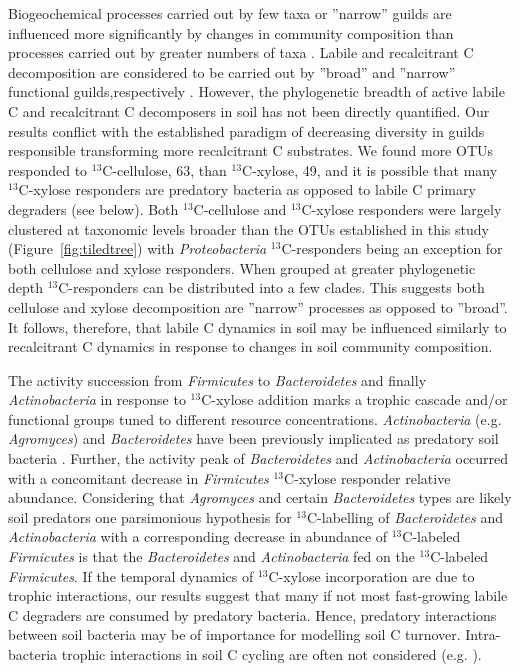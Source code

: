 Biogeochemical processes carried out by few taxa or ''narrow'' guilds are
influenced more significantly by changes in community composition than
processes carried out by greater numbers of taxa
\citep{Schimel_1995,McGuire2010}. Labile and recalcitrant C decomposition are
considered to be carried out by ''broad'' and ''narrow'' functional
guilds,respectively \citep{Schimel_1995,McGuire2010}. However, the phylogenetic
breadth of active labile C and recalcitrant C decomposers in soil has not been
directly quantified. Our results conflict with the established paradigm of
decreasing diversity in guilds responsible transforming more recalcitrant
C substrates. We found more OTUs responded to $^{13}$C-cellulose, 63, than
$^{13}$C-xylose, 49, and it is possible that many $^{13}$C-xylose responders
are predatory bacteria as opposed to labile C primary degraders (see below).
Both $^{13}$C-cellulose and $^{13}$C-xylose responders were largely clustered
at taxonomic levels broader than the OTUs established in this study
(Figure~\ref{fig:tiledtree}) with \textit{Proteobacteria} $^{13}$C-responders
being an exception for both cellulose and xylose responders. When grouped at
greater phylogenetic depth $^{13}$C-responders can be distributed into a few
clades. This suggests both cellulose and xylose decomposition are ''narrow''
processes as opposed to ''broad''. It follows, therefore, that labile C dynamics
in soil may be influenced similarly to recalcitrant C dynamics in response to
changes in soil community composition. 

The activity succession from \textit{Firmicutes} to \textit{Bacteroidetes} and
finally \textit{Actinobacteria} in response to $^{13}$C-xylose addition marks
a trophic cascade and/or functional groups tuned to different resource
concentrations. \textit{Actinobacteria} (e.g. \textit{Agromyces}) and
\textit{Bacteroidetes} have been previously implicated as predatory soil
bacteria \citep{Lueders2006}. Further, the activity peak of
\textit{Bacteroidetes} and \textit{Actinobacteria} occurred with a concomitant
decrease in \textit{Firmicutes} $^{13}$C-xylose responder relative abundance.
Considering that \textit{Agromyces} and certain \textit{Bacteroidetes} types
are likely soil predators \citep{Lueders2006,16346402} one parsimonious
hypothesis for $^{13}$C-labelling of \textit{Bacteroidetes} and
\textit{Actinobacteria} with a corresponding decrease in abundance of
$^{13}$C-labeled \textit{Firmicutes} is that the \textit{Bacteroidetes} and
\textit{Actinobacteria} fed on the $^{13}$C-labeled \textit{Firmicutes}. If the
temporal dynamics of $^{13}$C-xylose incorporation are due to trophic
interactions, our results suggest that many if not most fast-growing labile
C degraders are consumed by predatory bacteria. Hence, predatory interactions
between soil bacteria may be of importance for modelling soil C turnover.
Intra-bacteria trophic interactions in soil C cycling are often not
considered (e.g. \citealt{Moore1988}).

